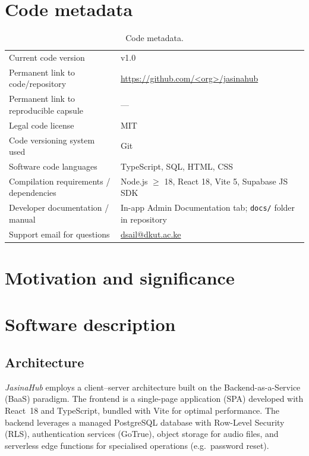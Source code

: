 \documentclass[final,5p,times,twocolumn]{elsarticle}
\begin{document}
\section*{Code metadata}

\begin{table}[h]
\centering
\caption{Code metadata.}
\label{tab:metadata}
\begin{tabularx}{\linewidth}{@{}lX@{}}
\toprule
Current code version & v1.0 \\
Permanent link to code/repository & \url{https://github.com/<org>/jasinahub} \\
Permanent link to reproducible capsule & --- \\
Legal code license & MIT \\
Code versioning system used & Git \\
Software code languages & TypeScript, SQL, HTML, CSS \\
Compilation requirements / dependencies & Node.js $\geq$ 18, React 18, Vite 5, Supabase JS SDK \\
Developer documentation / manual & In-app Admin Documentation tab; \texttt{docs/} folder in repository \\
Support email for questions & \href{mailto:dsail@dkut.ac.ke}{dsail@dkut.ac.ke} \\
\bottomrule
\end{tabularx}
\end{table}

\section{Motivation and significance}


\section{Software description}

\subsection{Architecture}
\emph{JasinaHub} employs a client--server architecture built on the Backend-as-a-Service (BaaS) paradigm. The frontend is a single-page application (SPA) developed with React~18 and TypeScript, bundled with Vite for optimal performance. The backend leverages a managed PostgreSQL database with Row-Level Security (RLS), authentication services (GoTrue), object storage for audio files, and serverless edge functions for specialised operations (e.g.\ password reset).
\end{document}
